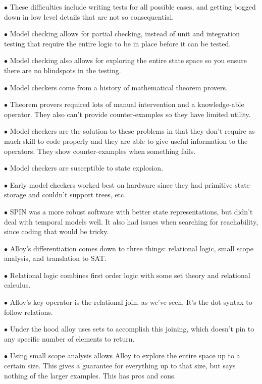 \documentclass[11pt]{article}
\begin{document}
\begin{enumerate}
      $\bullet$ These difficulties include writing tests for all possible cases, and getting bogged down in low level details that are not so consequential.
      
      $\bullet$ Model checking allows for partial checking, instead of unit and integration testing that require the entire logic to be in place before it can be tested.
      
      $\bullet$ Model checking also allows for exploring the entire state space so you ensure there are no blindspots in the testing.
      
      $\bullet$ Model checkers come from a history of mathematical theorem provers.
      
      $\bullet$ Theorem provers required lots of manual intervention and a knowledge-able operator. They also can't provide counter-examples so they have limited utility.
      
      $\bullet$ Model checkers are the solution to these problems in that they don't require as much skill to code properly and they are able to give useful information to the operators. They show counter-examples when something fails. 
      
      $\bullet$ Model checkers are susceptible to state explosion.
      
      $\bullet$ Early model checkers worked best on hardware since they had primitive state storage and couldn't support trees, etc.
      
      $\bullet$ SPIN was a more robust software with better state representations, but didn't deal with temporal models well. It also had issues when searching for reachability, since coding that would be tricky.
      
      $\bullet$ Alloy's differentiation comes down to three things: relational logic, small scope analysis, and translation to SAT.
      
      $\bullet$ Relational logic combines first order logic with some set theory and relational calculus.
      
      $\bullet$ Alloy's key operator is the relational join, as we've seen. It's the dot syntax to follow relations.
      
      $\bullet$ Under the hood alloy uses sets to accomplish this joining, which doesn't pin to any specific number of elements to return.
      
      $\bullet$ Using small scope analysis allows Alloy to explore the entire space up to a certain size. This gives a guarantee for everything up to that size, but says nothing of the larger examples. This has pros and cons.
      

\end{enumerate}
\end{document}
